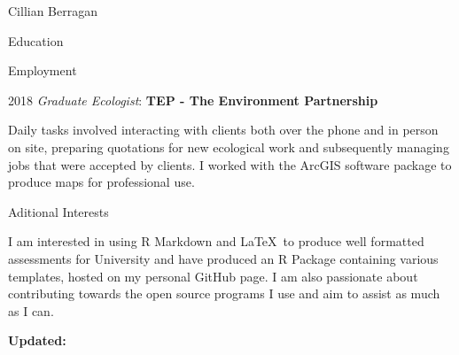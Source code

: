 \documentclass{scrartcl}
\begin{document}
\begin{cv}{Cillian Berragan}
\begin{cvlist}{Education}
\end{cvlist}

\begin{cvlist}{Employment}

    \item[2018] \normalsize\textit{Graduate Ecologist}: \textbf{TEP - The Environment Partnership}

    \small Daily tasks involved interacting with clients both over the phone and in person on site, preparing quotations for new ecological work and subsequently managing jobs that were accepted by clients. I worked with the ArcGIS software package to produce maps for professional use.

\end{cvlist}


\begin{cvlist}{Aditional Interests}
\item[]

\small I am interested in using R Markdown and \LaTeX\ to produce well formatted assessments for University and have produced an R Package containing various templates, hosted on my personal GitHub page. I am also passionate about contributing towards the open source programs I use and aim to assist as much as I can.


\end{cvlist}

\vfill

\small \textbf{Updated:} \end{cv}
\end{document}
